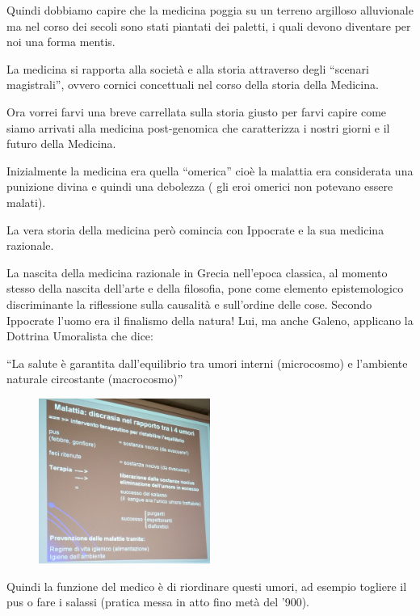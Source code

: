  Quindi dobbiamo capire che la medicina poggia su un terreno argilloso
  alluvionale ma nel corso dei secoli sono stati piantati dei paletti, i
  quali devono diventare per noi una forma mentis.

  La medicina si rapporta alla società e alla storia attraverso degli
  ``scenari magistrali'', ovvero cornici concettuali nel corso della
  storia della Medicina.

  Ora vorrei farvi una breve carrellata sulla storia giusto per farvi
  capire come siamo arrivati alla medicina post-genomica che
  caratterizza i nostri giorni e il futuro della Medicina.

  Inizialmente la medicina era quella ``omerica'' cioè la malattia era
  considerata una punizione divina e quindi una debolezza ( gli eroi
  omerici non potevano essere malati).

  La vera storia della medicina però comincia con Ippocrate e la sua
  medicina razionale.

  La nascita della medicina razionale in Grecia nell'epoca classica, al
  momento stesso della nascita dell'arte e della filosofia, pone come
  elemento epistemologico discriminante la riflessione sulla causalità e
  sull'ordine delle cose. Secondo Ippocrate l'uomo era il finalismo
  della natura! Lui, ma anche Galeno, applicano la Dottrina Umoralista
  che dice:

  ``La salute è garantita dall'equilibrio tra umori interni (microcosmo)
  e l'ambiente naturale circostante (macrocosmo)''

  \begin{figure}[!ht]
\centering
	\includegraphics[width=0.5\textwidth]{33/image2.jpeg}
	\end{figure}

  Quindi la funzione del medico è di riordinare questi umori, ad esempio
  togliere il pus o fare i salassi (pratica messa in atto fino metà del
  '900).

